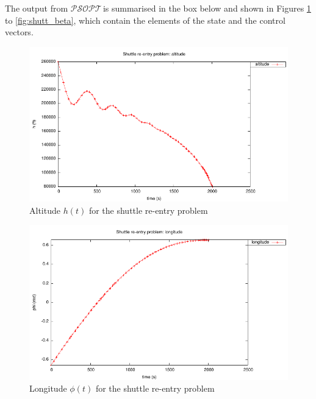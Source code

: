 \documentclass[a4paper,11pt]{report}    %
\newcommand{\psopt}{$\mathcal{PSOPT}$\,}  %
\newenvironment{shadedframe}{%
  \def\FrameCommand{\fcolorbox{black}{shadecolor}}%
  \MakeFramed {\FrameRestore}}
{\endMakeFramed}
\begin{document}
The output from \psopt is summarised in the box below and  shown in Figures \ref{fig:shutt_alt} to \ref{fig:shutt_beta}, which contain the elements
of the state and the control vectors.

\begin{shadedframe}

\end{shadedframe}


\begin{figure}
  \centering 
  \includegraphics{../examples/shutt/shutt_alt}
  \caption{Altitude $h(t)$ for the shuttle re-entry problem}
 \label{fig:shutt_alt}
\end{figure}

\begin{figure}
  \centering 
  \includegraphics{../examples/shutt/shutt_lon}
  \caption{Longitude $\phi(t)$ for the shuttle re-entry problem}
 \label{fig:shutt_lon}
\end{figure}
\end{document}
